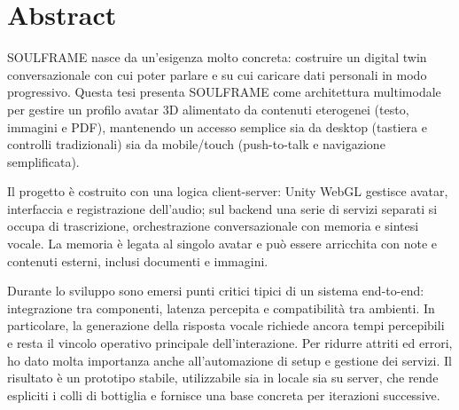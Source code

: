 ﻿\chapter*{Abstract}

SOULFRAME nasce da un'esigenza molto concreta: costruire un digital twin conversazionale con cui poter parlare e su cui caricare dati personali in modo progressivo. Questa tesi presenta SOULFRAME come architettura multimodale per gestire un profilo avatar 3D alimentato da contenuti eterogenei (testo, immagini e PDF), mantenendo un accesso semplice sia da desktop (tastiera e controlli tradizionali) sia da mobile/touch (push-to-talk e navigazione semplificata).

Il progetto è costruito con una logica client-server: Unity WebGL gestisce avatar, interfaccia e registrazione dell'audio; sul backend una serie di servizi separati si occupa di trascrizione, orchestrazione conversazionale con memoria e sintesi vocale. La memoria è legata al singolo avatar e può essere arricchita con note e contenuti esterni, inclusi documenti e immagini.

Durante lo sviluppo sono emersi punti critici tipici di un sistema end-to-end: integrazione tra componenti, latenza percepita e compatibilità tra ambienti. In particolare, la generazione della risposta vocale richiede ancora tempi percepibili e resta il vincolo operativo principale dell'interazione. Per ridurre attriti ed errori, ho dato molta importanza anche all'automazione di setup e gestione dei servizi. Il risultato è un prototipo stabile, utilizzabile sia in locale sia su server, che rende espliciti i colli di bottiglia e fornisce una base concreta per iterazioni successive.
